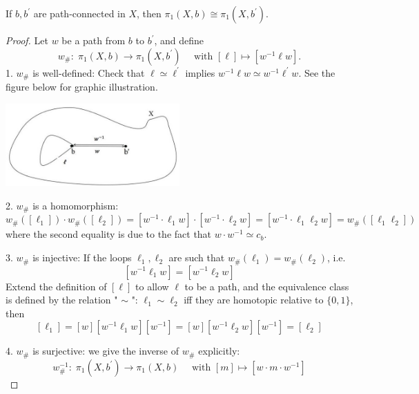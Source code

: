 \begin{proposition} \label{prop:path_connected_isomotphic} If \(b,{b}^{\prime }\) are path-connected in \(X\), then \({\pi }_{1}\left( {X,b}\right)  \cong  {\pi }_{1}\left( {X,{b}^{\prime }}\right)\).
\end{proposition}

\begin{proof} Let \(w\) be a path from \(b\) to \({b}^{\prime }\), and define
\[
{w}_{\# } : \;{\pi }_{1}\left( {X,b}\right)  \rightarrow  {\pi }_{1}\left( {X,{b}^{\prime }}\right)
\quad
\text{ with }\left\lbrack  \ell \right\rbrack   \mapsto  \left\lbrack  {{w}^{-1}\ell w}\right\rbrack.
\]
1. \({w}_{\# }\) is well-defined: Check that \(\ell  \simeq  {\ell }^{\prime }\) implies \({w}^{-1}\ell w \simeq  {w}^{-1}{\ell }^{\prime }w\). See the figure below for graphic illustration.
\begin{center}
\includegraphics[width=0.5\textwidth]{images/Ch7_path_connected.jpg}
\end{center}
2. \({w}_{\# }\) is a homomorphism:
\[
{w}_{\# }\left( \left\lbrack  {\ell }_{1}\right\rbrack  \right)  \cdot  {w}_{\# }\left( \left\lbrack  {\ell }_{2}\right\rbrack  \right)  = \left\lbrack  {{w}^{-1} \cdot  {\ell }_{1}w}\right\rbrack   \cdot  \left\lbrack  {{w}^{-1} \cdot  {\ell }_{2}w}\right\rbrack   = \left\lbrack  {{w}^{-1} \cdot  {\ell }_{1}{\ell }_{2}w}\right\rbrack  = {w}_{\# }\left( \left\lbrack  {{\ell }_{1}{\ell }_{2}}\right\rbrack  \right)  
\]
where the second equality is due to the fact that \(w \cdot  {w}^{-1} \simeq {c}_{b}\).

3. \({w}_{\# }\) is injective: If the loops \({\ell }_{1},{\ell }_{2}\) are such that \({w}_{\# }\left( {\ell }_{1}\right)  = {w}_{\# }\left( {\ell }_{2}\right)\), i.e.
\[
\left\lbrack  {{w}^{-1}{\ell }_{1}w}\right\rbrack   = \left\lbrack  {{w}^{-1}{\ell }_{2}w}\right\rbrack
\]
Extend the definition of \(\left\lbrack  \ell \right\rbrack\) to allow \(\ell\) to be a path, and the equivalence class is defined by the relation " \(\sim\) ": \({\ell }_{1} \sim  {\ell }_{2}\) iff they are homotopic relative to \(\{ 0,1\}\), then
\[
\left\lbrack  {\ell }_{1}\right\rbrack   = \left\lbrack  w\right\rbrack  \left\lbrack  {{w}^{-1}{\ell }_{1}w}\right\rbrack  \left\lbrack  {w}^{-1}\right\rbrack   = \left\lbrack  w\right\rbrack  \left\lbrack  {{w}^{-1}{\ell }_{2}w}\right\rbrack  \left\lbrack  {w}^{-1}\right\rbrack   = \left\lbrack  {\ell }_{2}\right\rbrack   \tag{11.5}
\]

4. \({w}_{\# }\) is surjective: we give the inverse of \({w}_{\# }\) explicitly:
\[
{w}_{\# }^{-1} : \;{\pi }_{1}\left( {X,{b}^{\prime }}\right)  \rightarrow  {\pi }_{1}\left( {X,b}\right)
\quad \text{ with }\left\lbrack  m\right\rbrack   \mapsto  \left\lbrack  {w \cdot  m \cdot  {w}^{-1}}\right\rbrack
\]
\end{proof}

